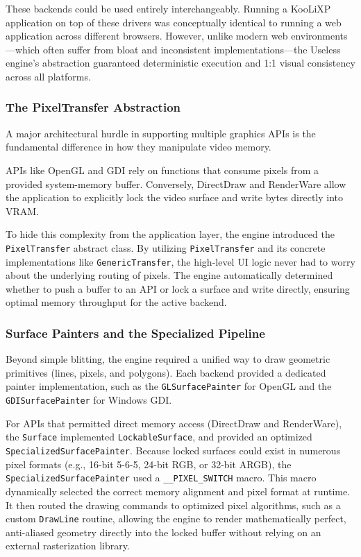 \documentclass[11pt, a4paper]{article}
\begin{document}
These backends could be used entirely interchangeably. Running a KooLiXP application on top of these drivers was conceptually identical to running a web application across different browsers. However, unlike modern web environments---which often suffer from bloat and inconsistent implementations---the Useless engine's abstraction guaranteed deterministic execution and 1:1 visual consistency across all platforms.



\subsubsection{The PixelTransfer Abstraction}
A major architectural hurdle in supporting multiple graphics APIs is the fundamental difference in how they manipulate video memory. 

APIs like OpenGL and GDI rely on functions that consume pixels from a provided system-memory buffer. Conversely, DirectDraw and RenderWare allow the application to explicitly lock the video surface and write bytes directly into VRAM. 

To hide this complexity from the application layer, the engine introduced the \texttt{PixelTransfer} abstract class. By utilizing \texttt{PixelTransfer} and its concrete implementations like \texttt{GenericTransfer}, the high-level UI logic never had to worry about the underlying routing of pixels. The engine automatically determined whether to push a buffer to an API or lock a surface and write directly, ensuring optimal memory throughput for the active backend.


\subsubsection{Surface Painters and the Specialized Pipeline}
Beyond simple blitting, the engine required a unified way to draw geometric primitives (lines, pixels, and polygons). Each backend provided a dedicated painter implementation, such as the \texttt{GLSurfacePainter} for OpenGL and the \texttt{GDISurfacePainter} for Windows GDI.

For APIs that permitted direct memory access (DirectDraw and RenderWare), the \texttt{Surface} implemented \texttt{LockableSurface}, and provided an optimized \texttt{SpecializedSurfacePainter}. Because locked surfaces could exist in numerous pixel formats (e.g., 16-bit 5-6-5, 24-bit RGB, or 32-bit ARGB), the \texttt{SpecializedSurfacePainter} used a \texttt{\_\_PIXEL\_SWITCH} macro. This macro dynamically selected the correct memory alignment and pixel format at runtime. It then routed the drawing commands to optimized pixel algorithms, such as a custom \texttt{DrawLine} routine, allowing the engine to render mathematically perfect, anti-aliased geometry directly into the locked buffer without relying on an external rasterization library.
\end{document}
